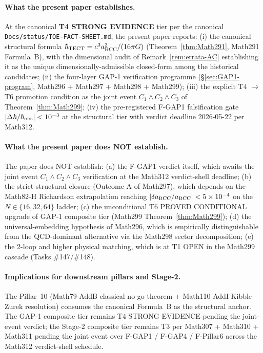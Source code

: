 \paragraph{What the present paper establishes.}
At the canonical \textbf{T4 STRONG EVIDENCE} tier per the canonical
\texttt{Docs/status/TOE-FACT-SHEET.md}, the present paper reports:
(i) the canonical structural formula
$\hbar_{\rm TECT} = c^3 a_{\rm BCC}^2 / (16\pi G)$
(Theorem~\ref{thm:Math291}, Math291 Formula~B), with the dimensional
audit of Remark~\ref{rem:errata-AC} establishing it as the unique
dimensionally-admissible closed-form among the historical
candidates; (ii) the four-layer GAP-1 verification programme
(\S\ref{sec:GAP1-program}, Math296 + Math297 + Math298 + Math299);
(iii) the explicit T4 $\to$ T6 promotion condition as the
joint event $C_1 \wedge C_2 \wedge C_3$ of
Theorem~\ref{thm:Math299}; (iv) the pre-registered F-GAP1
falsification gate $|\Delta\hbar/\hbar_{\rm obs}| < 10^{-3}$ at
the structural tier with verdict deadline 2026-05-22 per Math312.

\paragraph{What the present paper does NOT establish.}
The paper does NOT establish: (a) the F-GAP1 verdict itself,
which awaits the joint event $C_1 \wedge C_2 \wedge C_3$
verification at the Math312 verdict-shell deadline; (b) the strict
structural closure (Outcome A of Math297), which depends on the
Math82-H Richardson extrapolation reaching
$|\delta a_{\rm BCC}/a_{\rm BCC}| < 5 \times 10^{-4}$ on the
$N \in \{16, 32, 64\}$ ladder; (c) the unconditional T6 PROVED
CONDITIONAL upgrade of GAP-1 composite tier (Math299
Theorem~\ref{thm:Math299}); (d) the universal-embedding hypothesis
of Math296, which is empirically distinguishable from the
QCD-dominant alternative via the Math298 sector decomposition;
(e) the 2-loop and higher physical matching, which is at T1 OPEN
in the Math299 cascade (Tasks \#147/\#148).

\paragraph{Implications for downstream pillars and Stage-2.}
The Pillar~10 (Math79-AddB classical no-go theorem +
Math110-AddI Kibble--Zurek resolution) consumes the canonical
Formula~B as the structural anchor. The GAP-1 composite tier
remains T4 STRONG EVIDENCE pending the joint-event verdict; the
Stage-2 composite tier remains T3 per Math307 + Math310 + Math311
pending the joint event over F-GAP1 / F-GAP4 / F-Pillar6 across
the Math312 verdict-shell schedule.

